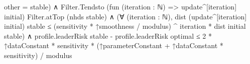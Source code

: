 \documentclass[10pt]{article}
\begin{document}
\begin{ReviewVerbatim}
                                                other = stable) ∧
                                            Filter.Tendsto (fun (iteration : ℕ) => update^[iteration] initial)
                                                Filter.atTop (nhds stable) ∧
                                              (∀ (iteration : ℕ),
                                                  dist (update^[iteration] initial) stable ≤
                                                    (sensitivity * ↑smoothness / modulus) ^ iteration *
                                                      dist initial stable) ∧
                                                profile.leaderRisk stable - profile.leaderRisk optimal ≤
                                                  2 * ↑dataConstant * sensitivity *
                                                      (↑parameterConstant + ↑dataConstant * sensitivity) /
                                                    modulus
\end{ReviewVerbatim}
\end{document}
